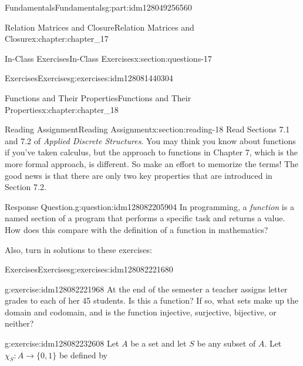 \documentclass[oneside,10pt,]{book}
\numberwithin{equation}{section}
\begin{document}
\begin{partptx}{Fundamentals}{}{Fundamentals}{}{}{g:part:idm128049256560}
\begin{chapterptx}{Relation Matrices and Closure}{}{Relation Matrices and Closure}{}{}{x:chapter:chapter_17}
\begin{sectionptx}{In-Class Exercises}{}{In-Class Exercises}{}{}{x:section:questions-17}
\begin{exercises-subsection}{Exercises}{}{Exercises}{}{}{g:exercises:idm128081440304}
\end{exercises-subsection}
\end{sectionptx}
\end{chapterptx}
%
\typeout{************************************************}
\typeout{************************************************}
%
\begin{chapterptx}{Functions and Their Properties}{}{Functions and Their Properties}{}{}{x:chapter:chapter_18}
%
%
%
\typeout{************************************************}
\typeout{************************************************}
%
\begin{sectionptx}{Reading Assignment}{}{Reading Assignment}{}{}{x:section:reading-18}
Read Sections 7.1 and 7.2 of \emph{Applied Discrete Structures}.  You may think you know about functions if you've taken calculus, but the approach to functions in Chapter 7, which is the more formal approach, is different. So make an effort to memorize the terms!  The good news is that there are only two key properties that are introduced in Section 7.2.%
\begin{question}{Response Question.}{g:question:idm128082205904}%
In programming, a \emph{function} is a named section of a program that performs a specific task and returns a value.  How does this compare with the definition of a function in mathematics?%
\end{question}
Also, turn in solutions to these exercises:%
%
%
\typeout{************************************************}
\typeout{************************************************}
%
\begin{exercises-subsection}{Exercises}{}{Exercises}{}{}{g:exercises:idm128082221680}
\par\medskip\noindent%
%
\begin{exercisegroup}
\begin{divisionexerciseeg}{1}{}{}{g:exercise:idm128082221968}%
At the end of the semester a teacher assigns letter grades to each of her 45 students. Is this a function? If so, what sets make up the domain and codomain, and is the function injective, surjective, bijective, or neither?%
\end{divisionexerciseeg}%
\begin{divisionexerciseeg}{2}{}{}{g:exercise:idm128082232608}%
Let \(A\) be a set and let \(S\) be any subset of \(A\). Let \(\chi_S: A\to \{0,1\}\) be defined by%
\begin{equation*}

\end{equation*}
\end{divisionexerciseeg}
\end{exercisegroup}
\end{exercises-subsection}
\end{sectionptx}
\end{chapterptx}
\end{partptx}
\end{document}
